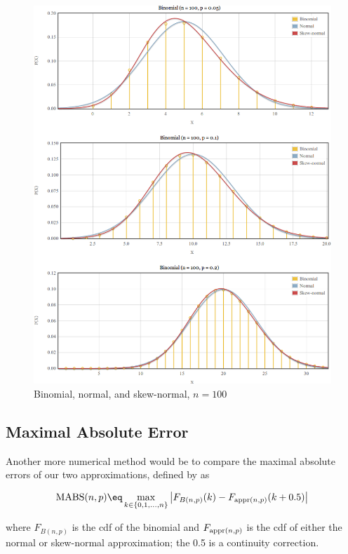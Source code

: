 \documentclass{article}
\begin{document}
\begin{figure}[h]
  \centering
  \includegraphics[width=\textwidth]{../graphs/images/comparison-n100.png}
  \caption{Binomial, normal, and skew-normal, $n=100$}
  \label{fig:comparison-n100}
\end{figure}

\subsection{Maximal Absolute Error}

Another more numerical method would be to compare the maximal absolute errors
of our two approximations, defined by \citet{mabs} as

\begin{equation}
  \textnormal{MABS}(n, p) \eq \max_{k \in \{0, 1,...,n\}} \left| F_{B(n,p)} (k) -  F_{\textnormal{appr}(n,p)}(k + 0.5) \right|
\end{equation}

where $F_{B(n,p)}$ is the cdf of the binomial and $F_{\textnormal{appr}(n,p)}$
is the cdf of either the normal or skew-normal approximation; the 0.5 is a
continuity correction.
\end{document}
